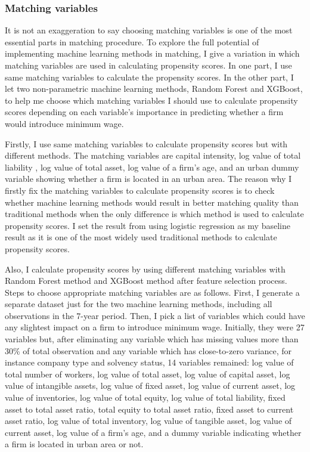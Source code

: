 \documentclass[11pt,a4paper,oneside]{article}
\begin{document}
\subsubsection{Matching variables}
It is not an exaggeration to say choosing matching variables is one of the most essential parts in matching procedure. To explore the full potential of implementing machine learning methods in matching, I give a variation in which matching variables are used in calculating propensity scores. In one part, I use same matching variables to calculate the propensity scores. In the other part, I let two non-parametric machine learning methods, Random Forest and XGBoost, to help me choose which matching variables I should use to calculate propensity scores depending on each variable's importance in predicting whether a firm would introduce minimum wage.
\par 
Firstly, I use same matching variables to calculate propensity scores but with different methods. The matching variables are capital intensity, log value of total liability , log value of total asset, log value of a firm's age, and an urban dummy variable showing whether a firm is located in an urban area. The reason why I firstly fix the matching variables to calculate propensity scores is to check whether machine learning methods would result in better matching quality than traditional methods when the only difference is which method is used to calculate propensity scores. I set the result from using logistic regression as my baseline result as it is one of the most widely used traditional methods to calculate propensity scores.
\par
Also, I calculate propensity scores by using different matching variables with Random Forest method and XGBoost method after feature selection process. Steps to choose appropriate matching variables are as follows. First, I generate a separate dataset just for the two machine learning methods, including all observations in the 7-year period. Then, I pick a list of variables which could have any slightest impact on a firm to introduce minimum wage. Initially, they were 27 variables but, after eliminating any variable which has missing values more than 30\% of total observation and any variable which has close-to-zero variance, for instance company type and solvency status, 14 variables remained: log value of total number of workers, log value of total asset, log value of capital asset, log value of intangible assets, log value of fixed asset, log value of current asset, log value of inventories, log value of total equity, log value of total liability, fixed asset to total asset ratio, total equity to total asset ratio, fixed asset to current asset ratio, log value of total inventory, log value of tangible asset, log value of current asset, log value of a firm's age, and a dummy variable indicating whether a firm is located in urban area or not. 
\end{document}
